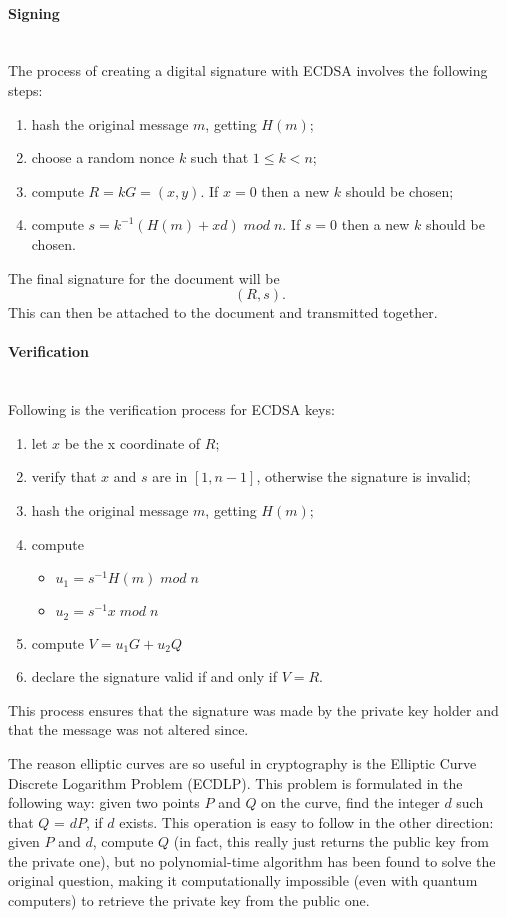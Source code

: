 \paragraph{Signing} \mbox{}\\
The process of creating a digital signature with ECDSA involves the following steps:
\begin{enumerate}[itemsep=-0.1em,topsep=2mm]
    \item hash the original message $m$, getting $H(m)$;
    \item choose a random nonce $k$ such that $1 \leq k < n$;
    \item compute $R = kG = (x, y)$. If $x = 0$ then a new $k$ should be chosen;
    \item compute $s = k^{-1}(H(m) + xd) \; mod \;n$. If $s = 0$ then a new $k$ should be chosen.
\end{enumerate}
The final signature for the document will be 
\[(R, s).\]
This can then be attached to the document and transmitted together. \cite{ecc}

\paragraph{Verification} \mbox{}\\
Following is the verification process for ECDSA keys:
\begin{enumerate}[itemsep=-0.1em,topsep=2mm]
    \item let $x$ be the x coordinate of $R$;
    \item verify that $x$ and $s$ are in $[1, n-1]$, otherwise the signature is invalid;
    \item hash the original message $m$, getting $H(m)$;
    \item compute
    \begin{itemize}[topsep=0pt]
        \item $u_1 = s^{-1}H(m) \; mod \; n$
        \item $u_2 = s^{-1}x \; mod \; n$
    \end{itemize}
    \item compute $V = u_1G + u_2Q$
    \item declare the signature valid if and only if $V = R$. 
\end{enumerate} 
This process ensures that the signature was made by the private key holder and that the message was not altered since.\cite{ecc}

The reason elliptic curves are so useful in cryptography is the Elliptic Curve Discrete Logarithm Problem (ECDLP). This problem is formulated in the following way: given two points $P$ and $Q$ on the curve, find the integer $d$ such that $Q$ = $dP$, if $d$ exists. This operation is easy to follow in the other direction: given $P$ and $d$, compute $Q$ (in fact, this really just returns the public key from the private one), but no polynomial-time algorithm has been found to solve the original question, making it computationally impossible (even with quantum computers) to retrieve the private key from the public one. \cite{ecdsa}


